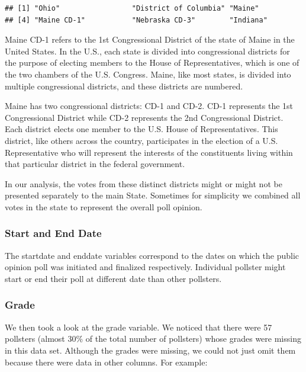\documentclass[
  11pt,
]{article}
\begin{document}
\begin{verbatim}
## [1] "Ohio"                 "District of Columbia" "Maine"               
## [4] "Maine CD-1"           "Nebraska CD-3"        "Indiana"
\end{verbatim}

Maine CD-1 refers to the 1st Congressional District of the state of
Maine in the United States. In the U.S., each state is divided into
congressional districts for the purpose of electing members to the House
of Representatives, which is one of the two chambers of the U.S.
Congress. Maine, like most states, is divided into multiple
congressional districts, and these districts are numbered.

Maine has two congressional districts: CD-1 and CD-2. CD-1 represents
the 1st Congressional District while CD-2 represents the 2nd
Congressional District. Each district elects one member to the U.S.
House of Representatives. This district, like others across the country,
participates in the election of a U.S. Representative who will represent
the interests of the constituents living within that particular district
in the federal government.

In our analysis, the votes from these distinct districts might or might
not be presented separately to the main State. Sometimes for simplicity
we combined all votes in the state to represent the overall poll
opinion.

\hypertarget{start-and-end-date}{%
\subsubsection{Start and End Date}\label{start-and-end-date}}

The startdate and enddate variables correspond to the dates on which the
public opinion poll was initiated and finalized respectively. Individual
pollster might start or end their poll at different date than other
pollsters.

\hypertarget{grade}{%
\subsubsection{Grade}\label{grade}}

We then took a look at the grade variable. We noticed that there were 57
pollsters (almost 30\% of the total number of pollsters) whose grades
were missing in this data set. Although the grades were missing, we
could not just omit them because there were data in other columns. For
example:
\end{document}
